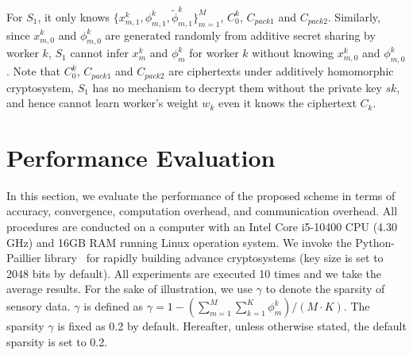 \documentclass[conference]{IEEEtran}
\begin{document}
For $S_1$, it only knows $\{x_{m,1}^k, \phi_{m,1}^k, \tilde{\phi}_{m,1}^k\}_{m=1}^M$, $C_0^k$, $C_{pack1}$ and $C_{pack2}$.
Similarly, since $x_{m,0}^k$ and $\phi_{m,0}^k$ are generated randomly from additive secret sharing by worker $k$, $S_1$ cannot infer $x_m^k$ and $\phi_m^k$ for worker $k$ without knowing $x_{m,0}^k$ and $\phi_{m,0}^k$.
Note that $C_0^k$, $C_{pack1}$ and $C_{pack2}$ are ciphertexts under additively homomorphic cryptosystem, $S_1$ has no mechanism to decrypt them without the private key $sk$, and hence cannot learn worker's weight $w_k$ even it knows the ciphertext $C_k$.

\section{Performance Evaluation}\label{sec7}
In this section, we evaluate the performance of the proposed scheme in terms of accuracy, convergence, computation overhead, and communication overhead.
All procedures are conducted on a computer with an Intel Core i5-10400 CPU (4.30 GHz) and 16GB RAM running Linux operation system.
We invoke the Python-Paillier library~\cite{paillier_public-key_1999} for rapidly building advance cryptosystems (key size is set to 2048 bits by default).
All experiments are executed 10 times and we take the average results.
For the sake of illustration, we use $\gamma$ to denote the sparsity of sensory data.
$\gamma$ is defined as $\gamma = 1 - (\sum_{m=1}^M\sum_{k=1}^K\phi_m^k) / (M\cdot K)$.
The sparsity $\gamma$ is fixed as 0.2 by default.
Hereafter, unless otherwise stated, the default sparsity is set to 0.2.
\end{document}
